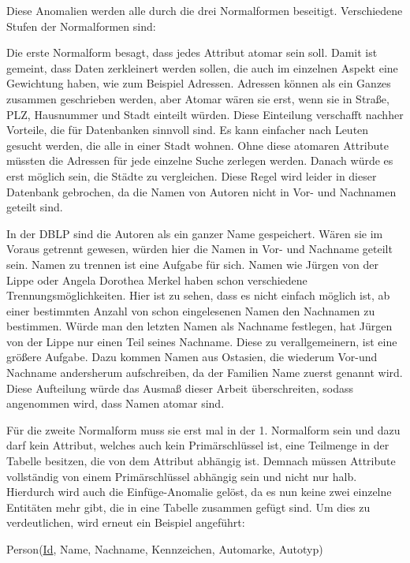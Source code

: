 Diese Anomalien werden alle durch die drei Normalformen beseitigt. 
Verschiedene Stufen der Normalformen sind:







Die erste Normalform besagt, dass jedes Attribut atomar sein soll. Damit ist gemeint, dass Daten zerkleinert werden sollen, die auch im einzelnen Aspekt eine Gewichtung haben, wie zum Beispiel Adressen. Adressen können als ein Ganzes zusammen geschrieben werden, aber Atomar wären sie erst, wenn sie in Straße, PLZ, Hausnummer und Stadt einteilt würden. Diese Einteilung verschafft nachher Vorteile, die für Datenbanken sinnvoll sind. Es kann einfacher nach Leuten gesucht werden, die alle in einer Stadt wohnen. Ohne diese atomaren Attribute müssten die Adressen für jede einzelne Suche zerlegen werden. Danach würde es erst möglich sein, die Städte zu vergleichen. Diese Regel wird leider in dieser Datenbank gebrochen, da die Namen von Autoren nicht in Vor- und Nachnamen geteilt sind.

In der DBLP sind die Autoren als ein ganzer Name gespeichert. Wären sie im Voraus getrennt gewesen, würden hier die Namen in Vor- und Nachname geteilt sein. Namen zu trennen ist eine Aufgabe für sich. Namen wie Jürgen von der Lippe oder Angela Dorothea Merkel haben schon verschiedene Trennungsmöglichkeiten. Hier ist zu sehen, dass es nicht einfach möglich ist, ab einer bestimmten Anzahl von schon eingelesenen Namen den Nachnamen zu bestimmen. Würde man den letzten Namen als Nachname festlegen, hat Jürgen von der Lippe nur einen Teil seines Nachname. Diese zu verallgemeinern, ist eine größere Aufgabe. Dazu kommen Namen aus Ostasien, die wiederum Vor-und Nachname andersherum aufschreiben, da der Familien Name zuerst genannt wird. Diese Aufteilung würde das Ausmaß dieser Arbeit überschreiten, sodass angenommen wird, dass Namen atomar sind. 

Für die zweite Normalform muss sie erst mal in der 1. Normalform sein und dazu darf kein Attribut, welches auch kein Primärschlüssel ist, eine Teilmenge in der Tabelle besitzen, die von dem Attribut abhängig ist. Demnach müssen Attribute vollständig von einem Primärschlüssel abhängig sein und nicht nur halb. Hierdurch wird auch die Einfüge-Anomalie gelöst, da es nun keine zwei einzelne Entitäten mehr gibt, die in eine Tabelle zusammen gefügt sind. Um dies zu verdeutlichen, wird erneut ein Beispiel angeführt:


\begin{small}
	Person(\uline{Id}, Name, Nachname, Kennzeichen, Automarke, Autotyp)
\end{small}


